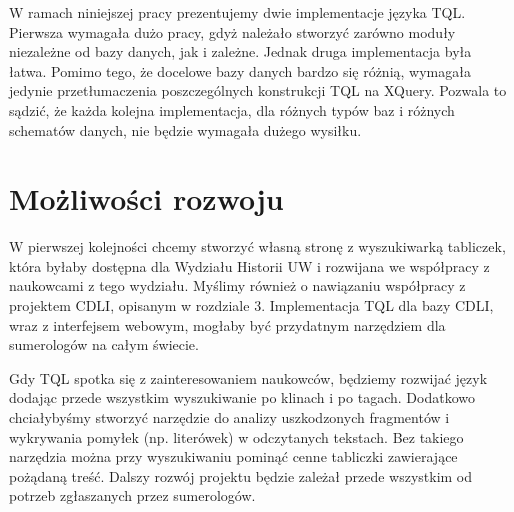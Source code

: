 
W ramach niniejszej pracy prezentujemy dwie implementacje języka TQL. Pierwsza wymagała dużo pracy, gdyż należało stworzyć zarówno moduły niezależne od bazy danych, jak i zależne. Jednak druga implementacja była łatwa. Pomimo tego, że docelowe bazy danych bardzo się różnią, wymagała jedynie przetłumaczenia poszczególnych konstrukcji TQL na XQuery. Pozwala to sądzić, że każda kolejna implementacja, dla różnych typów baz i różnych schematów danych, nie będzie wymagała dużego wysiłku. 


\section*{Możliwości rozwoju}

W pierwszej kolejności chcemy stworzyć własną stronę z wyszukiwarką tabliczek, która byłaby dostępna dla Wydziału Historii UW i rozwijana we współpracy z naukowcami z tego wydziału. Myślimy również o nawiązaniu współpracy z projektem CDLI, opisanym w rozdziale 3. Implementacja TQL dla bazy CDLI, wraz z interfejsem webowym, mogłaby być przydatnym narzędziem dla sumerologów na całym świecie.

Gdy TQL spotka się z zainteresowaniem naukowców, będziemy rozwijać język dodając przede wszystkim wyszukiwanie po klinach i po tagach. Dodatkowo chciałybyśmy stworzyć narzędzie do analizy uszkodzonych fragmentów i wykrywania pomyłek (np. literówek) w odczytanych tekstach. Bez takiego narzędzia można przy wyszukiwaniu pominąć cenne tabliczki zawierające pożądaną treść. Dalszy rozwój projektu będzie zależał przede wszystkim od potrzeb zgłaszanych przez sumerologów.





%
%
%
